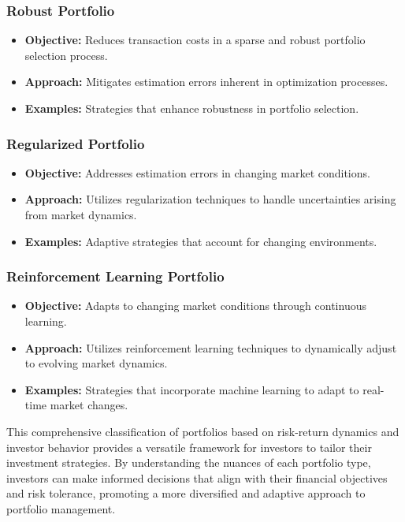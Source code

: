 \subsubsection{Robust Portfolio}
\begin{itemize}
    \item \textbf{Objective:} Reduces transaction costs in a sparse and robust portfolio selection process.
    \item \textbf{Approach:} Mitigates estimation errors inherent in optimization processes.
    \item \textbf{Examples:} Strategies that enhance robustness in portfolio selection.
\end{itemize}

\subsubsection{Regularized Portfolio}
\begin{itemize}
    \item \textbf{Objective:} Addresses estimation errors in changing market conditions.
    \item \textbf{Approach:} Utilizes regularization techniques to handle uncertainties arising from market dynamics.
    \item \textbf{Examples:} Adaptive strategies that account for changing environments.
\end{itemize}

\subsubsection{Reinforcement Learning Portfolio}
\begin{itemize}
    \item \textbf{Objective:} Adapts to changing market conditions through continuous learning.
    \item \textbf{Approach:} Utilizes reinforcement learning techniques to dynamically adjust to evolving market dynamics.
    \item \textbf{Examples:} Strategies that incorporate machine learning to adapt to real-time market changes.
\end{itemize}

This comprehensive classification of portfolios based on risk-return dynamics and investor behavior provides a versatile framework for investors to tailor their investment strategies. By understanding the nuances of each portfolio type, investors can make informed decisions that align with their financial objectives and risk tolerance, promoting a more diversified and adaptive approach to portfolio management.


